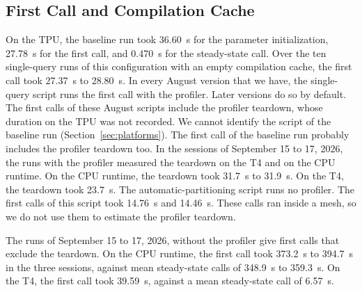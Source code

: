 \subsection{First Call and Compilation Cache}\label{sec:res-first}
On the TPU, the baseline run took 36.60~s for the parameter initialization, 27.78~s for the first call, and 0.470~s for the steady-state call. %
Over the ten single-query runs of this configuration with an empty compilation cache, the first call took 27.37~s to 28.80~s. %
In every August version that we have, the single-query script runs the first call with the profiler. Later versions do
so by default. The first calls of these August scripts include the profiler teardown, whose duration on the TPU was not
recorded. We cannot identify the script of the baseline run (Section~\ref{sec:platforms}). The first call of the
baseline run probably includes the profiler teardown too.
In the sessions of September 15 to 17, 2026, the runs with the profiler measured the teardown on the T4 and on the CPU runtime. On the CPU runtime, the teardown took 31.7~s to 31.9~s. %
On the T4, the teardown took 23.7~s. %
The automatic-partitioning script runs no profiler. The first calls of this script took 14.76~s and 14.46~s. %
These calls ran inside a mesh, so we do not use them to estimate the profiler teardown.

The runs of September 15 to 17, 2026, without the profiler give first calls that exclude the teardown. %
On the CPU runtime, the first call took 373.2~s to 394.7~s in the three sessions, against mean steady-state calls of 348.9~s to 359.3~s. %
On the T4, the first call took 39.59~s, against a mean steady-state call of 6.57~s. %

